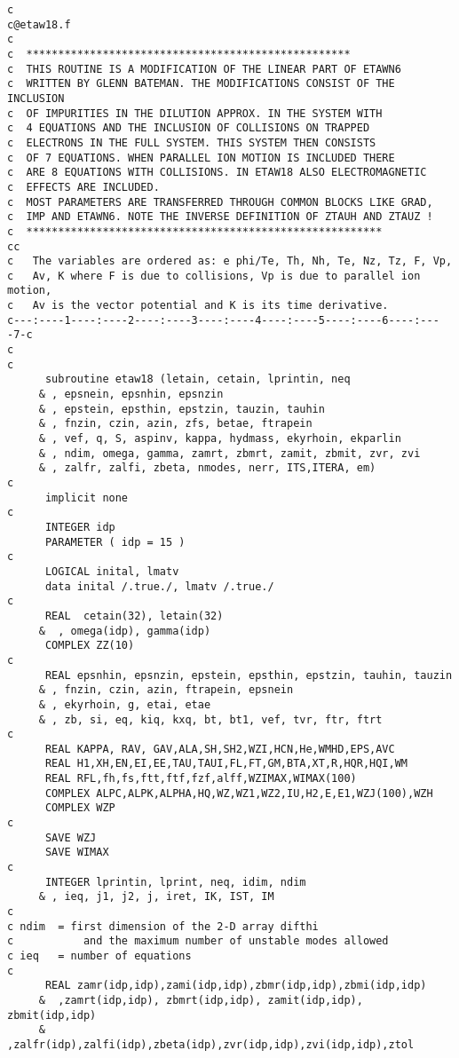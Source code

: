 \begin{verbatim}
c
c@etaw18.f
c
c  ***************************************************
c  THIS ROUTINE IS A MODIFICATION OF THE LINEAR PART OF ETAWN6
c  WRITTEN BY GLENN BATEMAN. THE MODIFICATIONS CONSIST OF THE INCLUSION
c  OF IMPURITIES IN THE DILUTION APPROX. IN THE SYSTEM WITH
c  4 EQUATIONS AND THE INCLUSION OF COLLISIONS ON TRAPPED
c  ELECTRONS IN THE FULL SYSTEM. THIS SYSTEM THEN CONSISTS
c  OF 7 EQUATIONS. WHEN PARALLEL ION MOTION IS INCLUDED THERE
c  ARE 8 EQUATIONS WITH COLLISIONS. IN ETAW18 ALSO ELECTROMAGNETIC 
c  EFFECTS ARE INCLUDED.  
c  MOST PARAMETERS ARE TRANSFERRED THROUGH COMMON BLOCKS LIKE GRAD,
c  IMP AND ETAWN6. NOTE THE INVERSE DEFINITION OF ZTAUH AND ZTAUZ !
c  ********************************************************
cc
c   The variables are ordered as: e phi/Te, Th, Nh, Te, Nz, Tz, F, Vp, 
c   Av, K where F is due to collisions, Vp is due to parallel ion motion,
c   Av is the vector potential and K is its time derivative.
c---:----1----:----2----:----3----:----4----:----5----:----6----:----7-c
c
c
      subroutine etaw18 (letain, cetain, lprintin, neq
     & , epsnein, epsnhin, epsnzin
     & , epstein, epsthin, epstzin, tauzin, tauhin
     & , fnzin, czin, azin, zfs, betae, ftrapein
     & , vef, q, S, aspinv, kappa, hydmass, ekyrhoin, ekparlin 
     & , ndim, omega, gamma, zamrt, zbmrt, zamit, zbmit, zvr, zvi
     & , zalfr, zalfi, zbeta, nmodes, nerr, ITS,ITERA, em) 
c
      implicit none
c
      INTEGER idp
      PARAMETER ( idp = 15 )
c
      LOGICAL inital, lmatv
      data inital /.true./, lmatv /.true./
c
      REAL  cetain(32), letain(32)
     &  , omega(idp), gamma(idp)
      COMPLEX ZZ(10)
c
      REAL epsnhin, epsnzin, epstein, epsthin, epstzin, tauhin, tauzin
     & , fnzin, czin, azin, ftrapein, epsnein
     & , ekyrhoin, g, etai, etae
     & , zb, si, eq, kiq, kxq, bt, bt1, vef, tvr, ftr, ftrt
c
      REAL KAPPA, RAV, GAV,ALA,SH,SH2,WZI,HCN,He,WMHD,EPS,AVC
      REAL H1,XH,EN,EI,EE,TAU,TAUI,FL,FT,GM,BTA,XT,R,HQR,HQI,WM
      REAL RFL,fh,fs,ftt,ftf,fzf,alff,WZIMAX,WIMAX(100)
      COMPLEX ALPC,ALPK,ALPHA,HQ,WZ,WZ1,WZ2,IU,H2,E,E1,WZJ(100),WZH
      COMPLEX WZP
c
      SAVE WZJ
      SAVE WIMAX
c
      INTEGER lprintin, lprint, neq, idim, ndim 
     & , ieq, j1, j2, j, iret, IK, IST, IM
c
c ndim  = first dimension of the 2-D array difthi
c           and the maximum number of unstable modes allowed
c ieq   = number of equations 
c
      REAL zamr(idp,idp),zami(idp,idp),zbmr(idp,idp),zbmi(idp,idp)
     &  ,zamrt(idp,idp), zbmrt(idp,idp), zamit(idp,idp), zbmit(idp,idp)
     &  ,zalfr(idp),zalfi(idp),zbeta(idp),zvr(idp,idp),zvi(idp,idp),ztol

\end{verbatim}

